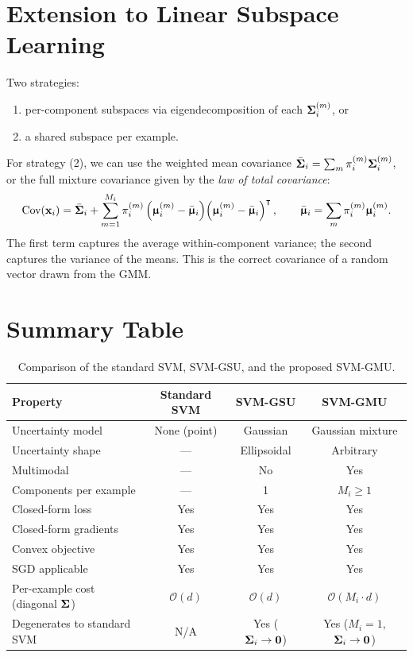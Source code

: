 \documentclass[11pt, letterpaper]{article}
\newcommand{\bSigma}{\vb{\Sigma}}
\newcommand{\bmu}{\boldsymbol{\upmu}}
\begin{document}
\section{Extension to Linear Subspace Learning}\label{sec:gmu_subspace}

Two strategies:
\begin{enumerate}
    \item per-component subspaces via eigendecomposition of each $\bSigma_i^{(m)}$, or
    \item a shared subspace per example.
\end{enumerate}
For strategy (2), we can use the weighted mean covariance $\bar{\bSigma}_i = \sum_m \pi_i^{(m)} \bSigma_i^{(m)}$, or the full mixture covariance given by the \emph{law of total covariance}:
\begin{equation}\label{eq:mixture_cov}
    \text{Cov}(\vb{x}_i) = \bar{\bSigma}_i + \sum_{m=1}^{M_i} \pi_i^{(m)}\left(\bmu_i^{(m)} - \bar{\bmu}_i\right)\!\left(\bmu_i^{(m)} - \bar{\bmu}_i\right)^{\intercal}, \qquad \bar{\bmu}_i = \sum_m \pi_i^{(m)} \bmu_i^{(m)}.
\end{equation}
The first term captures the average within-component variance; the second captures the variance of the means. This is the correct covariance of a random vector drawn from the GMM.

\section{Summary Table}

\begin{table}[H]
\centering
\caption{Comparison of the standard SVM, SVM-GSU, and the proposed SVM-GMU.}
\label{tab:comparison}
\renewcommand{\arraystretch}{1.4}
\begin{tabular}{@{}lccc@{}}
\toprule
\textbf{Property} & \textbf{Standard SVM} & \textbf{SVM-GSU} & \textbf{SVM-GMU} \\
\midrule
Uncertainty model & None (point) & Gaussian & Gaussian mixture \\
Uncertainty shape & --- & Ellipsoidal & Arbitrary \\
Multimodal & --- & No & Yes \\
Components per example & --- & 1 & $M_i \geq 1$ \\
Closed-form loss & Yes & Yes & Yes \\
Closed-form gradients & Yes & Yes & Yes \\
Convex objective & Yes & Yes & Yes \\
SGD applicable & Yes & Yes & Yes \\
Per-example cost (diagonal $\bSigma$) & $\mathcal{O}(d)$ & $\mathcal{O}(d)$ & $\mathcal{O}(M_i \cdot d)$ \\
Degenerates to standard SVM & N/A & Yes ($\bSigma_i \to \vb{0}$) & Yes ($M_i\!=\!1$, $\bSigma_i \to \vb{0}$) \\
\bottomrule
\end{tabular}
\end{table}
\end{document}
